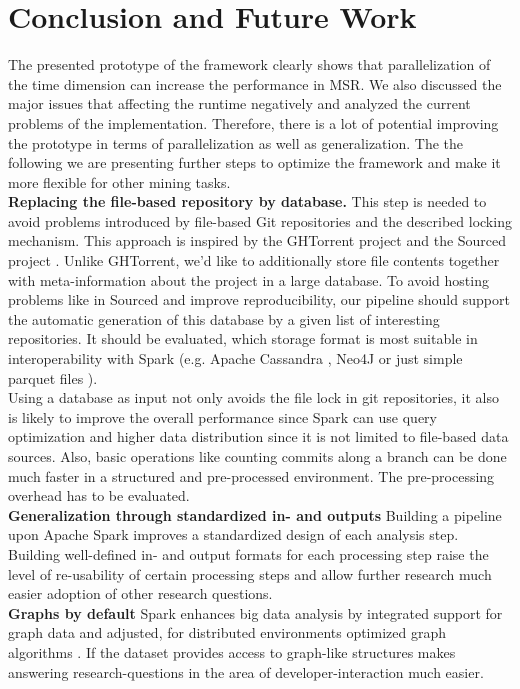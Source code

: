 
\section{Conclusion and Future Work}
\label{conclusion}
The presented prototype of the \iris framework clearly shows that parallelization of the time dimension can increase the performance in MSR. We also discussed the major issues that affecting the runtime negatively and analyzed the current problems of the implementation. Therefore, there is a lot of potential improving the prototype in terms of parallelization as well as generalization. The the following we are presenting further steps to optimize the framework and make it more flexible for other mining tasks.\\
\textbf{Replacing the file-based repository by database.}
This step is needed to avoid problems introduced by file-based Git repositories and the described locking mechanism. This approach is inspired by the GHTorrent project \cite{Gousios2012, Gousios2015} and the Sourced project \cite{Markovtsev2018}. Unlike GHTorrent, we'd like to additionally store file contents together with meta-information about the project in a large database. To avoid hosting problems like in Sourced and improve reproducibility, our pipeline should support the automatic generation of this database by a given list of interesting repositories. It should be evaluated, which storage format is most suitable in interoperability with Spark (e.g. Apache Cassandra \cite{lakshman2010cassandra}, Neo4J \cite{neo4j} or just simple parquet files \cite{parquet}).\\
Using a database as input not only avoids the file lock in git repositories, it also is likely to improve the overall performance since Spark can use query optimization and higher data distribution since it is not limited to file-based data sources. Also, basic operations like counting commits along a branch can be done much faster in a structured and pre-processed environment. The pre-processing overhead has to be evaluated.\\
\textbf{Generalization through standardized in- and outputs} Building a pipeline upon Apache Spark improves a standardized design of each analysis step. Building well-defined in- and output formats for each processing step raise the level of re-usability of certain processing steps and allow further research much easier adoption of other research questions.\\
\textbf{Graphs by default} Spark enhances big data analysis by integrated support for graph data and adjusted, for distributed environments optimized graph algorithms \cite{graphx}. If the dataset provides access to graph-like structures makes answering research-questions in the area of developer-interaction much easier.\\
